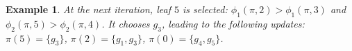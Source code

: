 \documentclass[]{article}
\newtheorem{example}{Example}
\begin{document}
\begin{example}
        
    

    
    

    



At the next iteration, leaf $5$ is selected: $\phi_1(\pi,2) > \phi_1(\pi,3)$ and $\phi_2(\pi,5) > \phi_2(\pi,4)$. It chooses $g_3$, leading to the following updates: $\pi(5) = \{g_3\}$, $\pi(2) = \{g_1,g_3\}$, $\pi(0) = \{g_4,g_5\}$.

        

\end{example}
\end{document}
